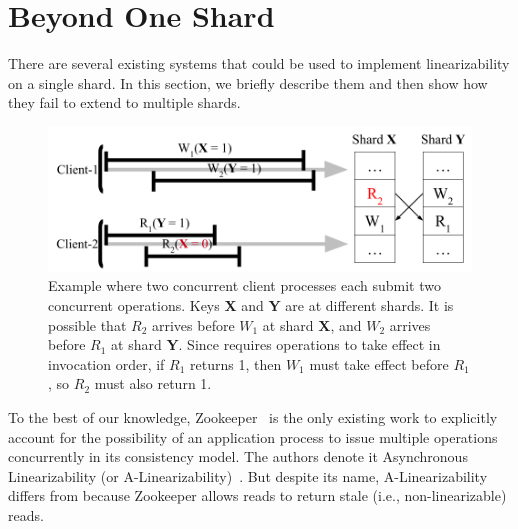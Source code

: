 \section{\MDL{} Beyond One Shard}
\label{sec:mdl:zookeeper}



There are several existing systems that could be used to implement
\multidispatch{} linearizability on a single shard. In this section,
we briefly describe them and then show how they fail to extend to
multiple shards.

\begin{figure}[!tb]
    \includegraphics[scale=.45]{figs/somet.png}
    \caption{Example where two concurrent client processes each submit two concurrent operations. Keys \textbf{X} and \textbf{Y} are at different shards. It is possible that $R_2$ arrives before $W_1$ at shard \textbf{X}, and $W_2$ arrives before $R_1$ at shard \textbf{Y}. Since \MDL{} requires operations to take effect in invocation order, if $R_1$ returns 1, then $W_1$ must take effect before $R_1$, so $R_2$ must also return 1.}
    \label{fig:concurrentbatches}
\end{figure}

To the best of our knowledge, Zookeeper~\cite{hunt2010zookeeper} is the
only existing work to explicitly account for the possibility of an 
application process to issue multiple operations concurrently in its
consistency model. The authors denote it Asynchronous Linearizability
(or A-Linearizability)~\cite{hunt2010zookeeper}. But despite its name,
A-Linearizability differs from \MDL{} because Zookeeper allows
reads to return stale (i.e., non-linearizable) reads.

